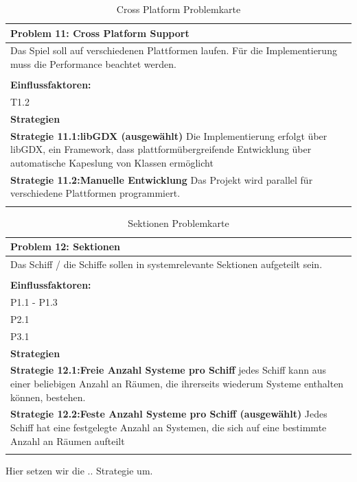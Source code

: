 \documentclass[fontsize=12pt,paper=a4,twoside]{scrartcl}
\begin{document}
\begin{table}[H]
    \centering
    \begin{tabular}{|p{15cm}|}
    \hline
          \textbf{Problem 11: Cross Platform Support}  \\ \hline
	Das Spiel soll auf verschiedenen Plattformen laufen. Für die Implementierung muss die Performance beachtet werden. \\
         \\ \hline
          \textbf{Einflussfaktoren: } \\
	T1.2 \\
          \hline
          \textbf{Strategien} \\ \hline
            {}          
           \label{strategie:11.1}     
          \textbf{Strategie 11.1:libGDX (ausgewählt)} Die Implementierung erfolgt über libGDX, ein Framework, dass plattformübergreifende Entwicklung über automatische Kapeslung von Klassen ermöglicht \\        
  {}          
           \label{strategie:11.2}              
          \textbf{Strategie 11.2:Manuelle Entwicklung} Das Projekt wird parallel für verschiedene Plattformen programmiert.  \\
	 \\ \hline
    \end{tabular}

    \caption{Cross Platform Problemkarte}
    \label{tab:ProblemKarte11}
\end{table}

\begin{table}[H]
    \centering
    \begin{tabular}{|p{15cm}|}
    \hline
          \textbf{Problem 12: Sektionen}  \\ \hline
	Das Schiff / die Schiffe sollen in systemrelevante Sektionen aufgeteilt sein. \\
         \\ \hline
          \textbf{Einflussfaktoren: } \\
	P1.1 - P1.3 \\
	P2.1 \\
	P3.1 \\
          \hline
          \textbf{Strategien} \\ \hline
            {}          
           \label{strategie:12.1}     
          \textbf{Strategie 12.1:Freie Anzahl Systeme pro Schiff} jedes Schiff kann aus einer beliebigen Anzahl an Räumen, die ihrerseits wiederum Systeme enthalten können, bestehen.  \\        
  {}          
           \label{strategie:12.2}              
          \textbf{Strategie 12.2:Feste Anzahl Systeme pro Schiff (ausgewählt)} Jedes Schiff hat eine festgelegte Anzahl an Systemen, die sich auf eine bestimmte Anzahl an Räumen aufteilt  \\ 
	 \\ \hline
    \end{tabular}

    \caption{Sektionen Problemkarte}
    \label{tab:ProblemKarte12}
\end{table}
Hier setzen wir die .. Strategie um. \\
\end{document}
